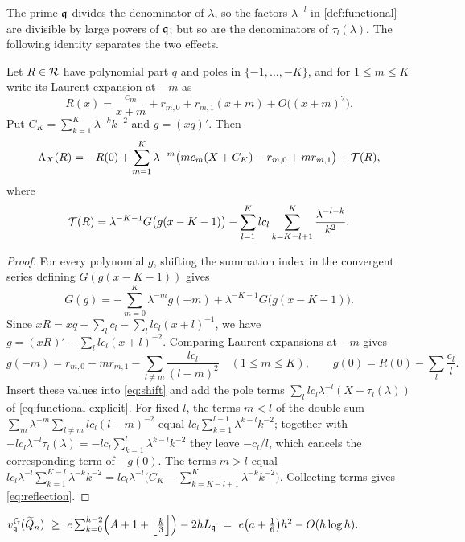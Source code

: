 The prime $\mathfrak{q}$ divides the denominator of $\lambda$, so the factors $\lambda^{-l}$ in \cref{def:functional} are divisible by large powers of $\mathfrak{q}$; but so are the denominators of $\tau_l(\lambda)$. The following identity separates the two effects.

\begin{lemma}\label{lem:reflection}
Let $R\in\mathcal{R}$ have polynomial part $q$ and poles in $\{-1,\dots,-K\}$, and for $1\le m\le K$ write its Laurent expansion at $-m$ as
\[
R(x)=\frac{c_m}{x+m}+r_{m,0}+r_{m,1}(x+m)+O\bigl((x+m)^2\bigr).
\]
Put $C_K=\sum_{k=1}^K\lambda^{-k}k^{-2}$ and $g=(xq)'$. Then
\begin{equation}\label{eq:reflection}
\Lambda_X(R)=-R(0)+\sum_{m=1}^K\lambda^{-m}\bigl(mc_m(X+C_K)-r_{m,0}+mr_{m,1}\bigr)+\mathcal{T}(R),
\end{equation}
where
\[
\mathcal{T}(R)=\lambda^{-K-1}G\bigl(g(x-K-1)\bigr)-\sum_{l=1}^Klc_l\sum_{k=K-l+1}^K\frac{\lambda^{-l-k}}{k^2}.
\]
\end{lemma}

\begin{proof}
For every polynomial $g$, shifting the summation index in the convergent series defining $G(g(x-K-1))$ gives
\begin{equation}\label{eq:shift}
G(g)=-\sum_{m=0}^K\lambda^{-m}g(-m)+\lambda^{-K-1}G\bigl(g(x-K-1)\bigr).
\end{equation}
Since $xR=xq+\sum_lc_l-\sum_l lc_l(x+l)^{-1}$, we have $g=(xR)'-\sum_llc_l(x+l)^{-2}$. Comparing Laurent expansions at $-m$ gives
\[
g(-m)=r_{m,0}-mr_{m,1}-\sum_{l\ne m}\frac{lc_l}{(l-m)^2}\quad(1\le m\le K),\qquad g(0)=R(0)-\sum_l\frac{c_l}l .
\]
Insert these values into \eqref{eq:shift} and add the pole terms $\sum_llc_l\lambda^{-l}(X-\tau_l(\lambda))$ of \eqref{eq:functional-explicit}. For fixed $l$, the terms $m<l$ of the double sum $\sum_m\lambda^{-m}\sum_{l\ne m}lc_l(l-m)^{-2}$ equal $lc_l\sum_{k=1}^{l-1}\lambda^{k-l}k^{-2}$; together with $-lc_l\lambda^{-l}\tau_l(\lambda)=-lc_l\sum_{k=1}^{l}\lambda^{k-l}k^{-2}$ they leave $-c_l/l$, which cancels the corresponding term of $-g(0)$. The terms $m>l$ equal $lc_l\lambda^{-l}\sum_{k=1}^{K-l}\lambda^{-k}k^{-2}=lc_l\lambda^{-l}\bigl(C_K-\sum_{k=K-l+1}^K\lambda^{-k}k^{-2}\bigr)$. Collecting terms gives \eqref{eq:reflection}.
\end{proof}

\begin{proposition}\label{prop:Q}
$\vg\pQ(\Qt_n)\ \ge\ e\sum_{k=0}^{h-2}\Bigl(A+1+\Bigl\lfloor\frac k3\Bigr\rfloor\Bigr)-2hL_{\pQ}\ =\ e\bigl(a+\tfrac16\bigr)h^2-O(h\log h).$
\end{proposition}

